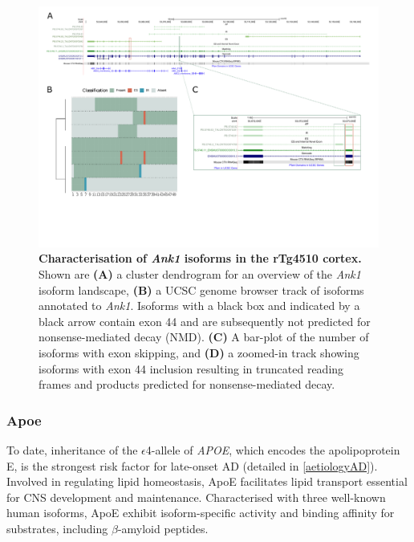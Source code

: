 \begin{landscape}
	\begin{figure}[htp]
		\centering
		\captionsetup{width=1.3\textwidth}
		\includegraphics[page=3,trim={0 1.5cm 0 0},scale = 0.85]{Figures/TargetGenes_Annotation_Landscape.pdf}
		\caption[Characterisation of \textit{Ank1} isoforms]%
		{\textbf{Characterisation of \textit{Ank1} isoforms in the rTg4510 cortex.} Shown are \textbf{(A)} a cluster dendrogram for an overview of the \textit{Ank1} isoform landscape, \textbf{(B)} a UCSC genome browser track of isoforms annotated to \textit{Ank1}. Isoforms with a black box and indicated by a black arrow contain exon 44 and are subsequently not predicted for nonsense-mediated decay (NMD). \textbf{(C)} A bar-plot of the number of isoforms with exon skipping, and \textbf{(D)} a zoomed-in track showing isoforms with exon 44 inclusion resulting in truncated reading frames and products predicted for nonsense-mediated decay. }    
		\label{fig:ank1}
	\end{figure}
\end{landscape}
\restoregeometry

\newpage
\subsubsection{Apoe}
\label{ch6: apoe}
To date, inheritance of the $\epsilon$4-allele of \textit{APOE}, which encodes the apolipoprotein E, is the strongest risk factor for late-onset AD (detailed in \cref{aetiologyAD}). Involved in regulating lipid homeostasis, ApoE facilitates lipid transport essential for CNS development and maintenance. Characterised with three well-known human isoforms, ApoE exhibit isoform-specific activity and binding affinity for substrates, including $\beta$-amyloid peptides\cite{Jablonski2021}. 

